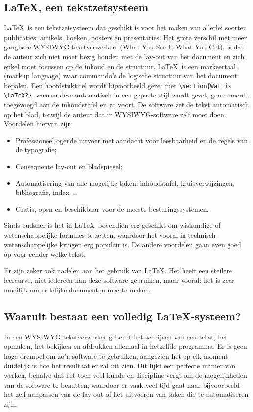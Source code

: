 \documentclass[kulak]{kulakarticle} %
\begin{document}
\subsection{\LaTeX, een tekstzetsysteem}
\LaTeX\ is een tekstzetsysteem dat geschikt is voor het maken van allerlei soorten publicaties: artikels, boeken, posters en presentaties. Het grote verschil met meer gangbare WYSIWYG-tekstverwerkers (What You See Is What You Get), is dat de auteur zich niet moet bezig houden met de lay-out van het document en zich enkel moet focussen op de inhoud en de structuur. \LaTeX\ is een markeertaal (markup language) waar commando's de logische structuur van het document bepalen. Een hoofdstuktitel wordt bijvoorbeeld gezet met \verb+\section{Wat is \LaTeX?}+, waarna deze automatisch in een gepaste stijl wordt gezet, genummerd, toegevoegd aan de inhoudstafel en zo voort. De software zet de tekst automatisch op het blad, terwijl de auteur dat in WYSIWYG-software zelf moet doen. Voordelen hiervan zijn:
\begin{itemize}
	\item Professioneel ogende uitvoer met aandacht voor leesbaarheid en de regels van de typografie;
	\item Consequente lay-out en bladspiegel;
	\item Automatisering van alle mogelijke taken: inhoudstafel, kruisverwijzingen, bibliografie, index, ...
	\item Gratis, open en beschikbaar voor de meeste besturingssystemen.
\end{itemize}
Sinds oudsher is het in \LaTeX\ bovendien erg geschikt om wiskundige of wetenschappelijke formules te zetten, waardoor het vooral in technisch-wetenschappelijke kringen erg populair is. De andere voordelen gaan even goed op voor eender welke tekst.

Er zijn zeker ook nadelen aan het gebruik van \LaTeX. Het heeft een steilere leercurve, niet iedereen kan deze software gebruiken, maar vooral: het is zeer moeilijk om er lelijke documenten mee te maken.

\subsection{Waaruit bestaat een volledig \LaTeX-systeem?}
In een WYSIWYG tekstverwerker gebeurt het schrijven van een tekst, het opmaken, het bekijken en afdrukken allemaal in hetzelfde programma. Er is geen hoge drempel om zo'n software te gebruiken, aangezien het op elk moment duidelijk is hoe het resultaat er zal uit zien. Dit lijkt een perfecte manier van werken, behalve dat het toch veel kunde en discipline vergt om de mogelijkheden van de software te benutten, waardoor er vaak veel tijd gaat naar bijvoorbeeld het zelf aanpassen van de lay-out of het uitvoeren van taken die te automatiseren zijn.
\end{document}
